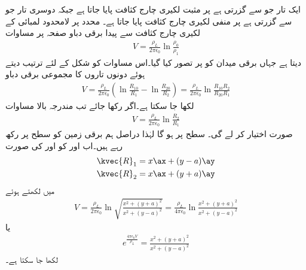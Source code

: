 ایک تار جو  سے گزرتی ہے  پر مثبت لکیری چارج کثافت  پایا جاتا ہے جبکہ دوسری تار جو  سے گزرتی ہے  پر منفی لکیری چارج کثافت  پایا جاتا ہے۔ محدد پر لامحدود لمبائی کے لکیری چارج کثافت سے پیدا برقی دباو صفحہ  پر مساوات 
\begin{align*}
V=\frac{\rho_L}{2\pi \epsilon_0} \ln \frac{\rho_0}{\rho_1}
\end{align*}
 دیتا ہے جہاں برقی میدان کو  پر تصور کیا گیا۔اس مساوات کو شکل  کے لئے ترتیب دیتے ہوئے دونوں تاروں کا مجموعی برقی دباو
\begin{align*}
V=\frac{\rho_L}{2\pi \epsilon_0}\left( \ln \frac{R_{10}}{R_1}-\ln \frac{R_{20}}{R_2} \right)=\frac{\rho_L}{2\pi \epsilon_0} \ln \frac{R_{10} R_2}{R_{20}R_1}
\end{align*}
لکھا جا سکتا ہے۔اگر  رکھا جائے تب مندرجہ بالا مساوات 
\begin{align*}
V=\frac{\rho_L}{2\pi \epsilon_0} \ln \frac{R_2}{R_1}
\end{align*}
صورت اختیار کر لے گی۔ سطح  پر  ہو گا لہٰذا دراصل ہم برقی زمین کو  سطح پر رکھ رہے ہیں۔اب  اور  کو  اور  کی صورت
\begin{align*}
\kvec{R}_1&=x\ax+(y-a)\ay\\
\kvec{R}_2&=x\ax+(y+a)\ay
\end{align*}
 میں لکھتے ہوئے
\begin{align}\label{مساوات_کپیسٹر_ہم_قوہ_سطح_کارتیسی_مساوات}
V=\frac{\rho_L}{2\pi \epsilon_0} \ln \sqrt {\frac{x^2+(y+a)^2}{x^2+(y-a)^2}}=\frac{\rho_L}{4\pi \epsilon_0} \ln \frac{x^2+(y+a)^2}{x^2+(y-a)^2}
\end{align}
یا
\begin{align}
e^{\frac{4\pi\epsilon_0 V}{\rho_L}}=\frac{x^2+(y+a)^2}{x^2+(y-a)^2}
\end{align}
لکھا جا سکتا ہے۔

